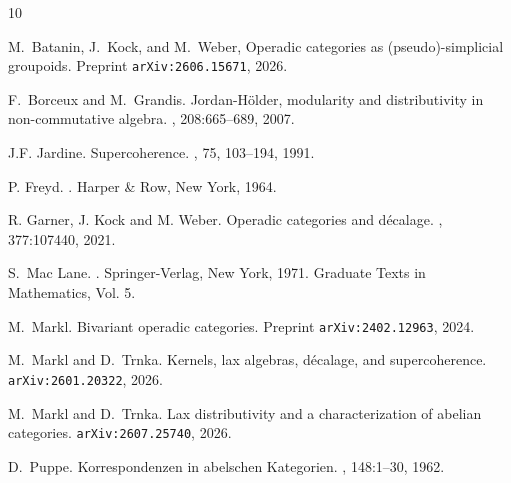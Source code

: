 \documentclass[12pt,leqno]{amsart}
\theoremstyle{definition}
\newcommand{\4}{\texttt{4}}
\begin{document}
 
\begin{thebibliography}{10}

M.~Batanin, J.~Kock, and M.~Weber,
\newblock Operadic categories as (pseudo)-simplicial groupoids.
\newblock Preprint {\tt arXiv:2606.15671}, 2026.

F.~Borceux and M.~Grandis.
\newblock Jordan-H{\"o}lder, modularity and distributivity in non-commutative algebra.
, 208:665--689, 2007.


J.F. Jardine.
\newblock Supercoherence.
, 75, 103--194, 1991.


P. Freyd.
.
\newblock Harper \& Row, New York, 1964.


R. Garner, J. Kock and M. Weber.
\newblock Operadic categories and d\'ecalage.
, 377:107440, 2021.


S.~{Mac Lane}.
.
\newblock Springer-Verlag, New York, 1971.
\newblock Graduate Texts in Mathematics, Vol. 5.

M.~Markl.
\newblock Bivariant operadic categories.
\newblock Preprint {\tt arXiv:2402.12963}, 2024.

M.~Markl and D.~Trnka.
\newblock Kernels, lax algebras, d\'ecalage, and supercoherence.
 {\tt arXiv:2601.20322}, 2026.

M.~Markl and D.~Trnka.
\newblock Lax distributivity and a characterization of abelian
categories.
\hfill\break 
{} {\tt arXiv:2607.25740}, 2026.

D.~Puppe.
\newblock Korrespondenzen in abelschen Kategorien.
, 148:1--30, 1962.

\end{thebibliography}
\end{document}
